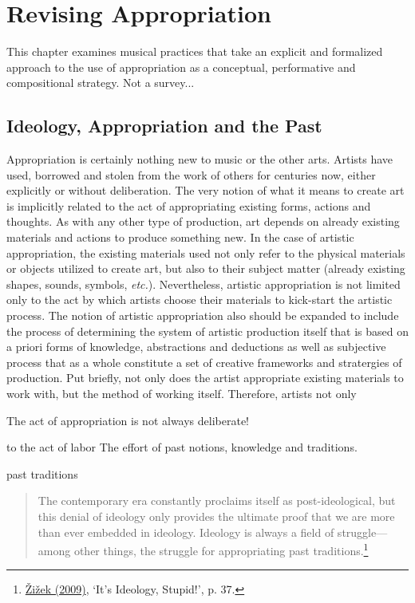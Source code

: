\hypertarget{chapter5}{}
\chapter{Revising Appropriation}

This chapter examines musical practices that take an explicit and formalized approach to the use of appropriation as a conceptual, performative and compositional strategy.
Not a survey...

\section{Ideology, Appropriation and the Past}

Appropriation is certainly nothing new to music or the other arts. Artists have used, borrowed and stolen from the work of others for centuries now, either explicitly or without deliberation. The very notion of what it means to create art is implicitly related to the act of appropriating existing forms, actions and thoughts. As with any other type of production, art depends on already existing materials and actions to produce something new. In the case of artistic appropriation, the existing materials used not only refer to the physical materials or objects utilized to create art, but also to their subject matter (already existing shapes, sounds, symbols, \emph{etc.}). Nevertheless, artistic appropriation is not limited only to the act by which artists choose their materials to kick-start the artistic process. The notion of artistic appropriation also should be expanded to include the process of determining the system of artistic production itself that is based on a priori forms of knowledge, abstractions and deductions as well as subjective process that as a whole constitute a set of creative frameworks and stratergies of production. Put briefly, not only does the artist appropriate existing materials to work with, but the method of working itself. Therefore, artists not only 


The act of appropriation is not always deliberate!

to the act of labor The effort
of past notions, knowledge and traditions. 

past traditions

\begin{quote}
The contemporary era constantly proclaims itself as post-ideological, but this denial of ideology only provides the ultimate proof that we are more than ever embedded in ideology. Ideology is always a field of struggle---among other things, the struggle for appropriating past traditions.\footnote{\hyperlink{zizektragedy}{\v{Z}i\v{z}ek (2009)}, `It's Ideology, Stupid!', p. 37.}
\end{quote}



